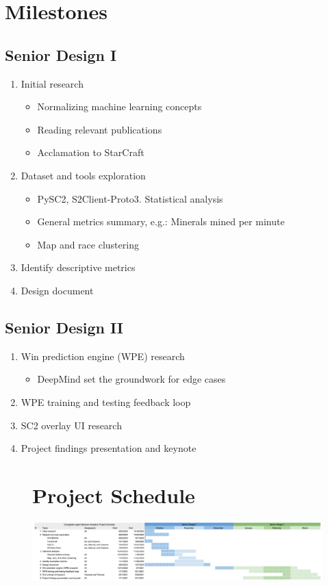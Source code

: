 \documentclass[a4paper,12pt]{report}
\begin{document}
\section{Milestones}
\subsection{Senior Design I}

\begin{enumerate}
    \item Initial research
    \begin{itemize}
        \item Normalizing machine learning concepts
        \item Reading relevant publications
        \item Acclamation to StarCraft
    \end{itemize}
    \item Dataset and tools exploration
    \begin{itemize}
        \item PySC2, S2Client-Proto3. Statistical analysis
        \item General metrics summary, e.g.: Minerals mined per minute
        \item Map and race clustering
    \end{itemize}
    \item Identify descriptive metrics
    \item Design document
\end{enumerate}

\subsection{Senior Design II}

\begin{enumerate}
    \item Win prediction engine (WPE) research
    \begin{itemize}
        \item DeepMind set the groundwork for edge cases
    \end{itemize}
    \item WPE training and testing feedback loop
    \item SC2 overlay UI research
    \item Project findings presentation and keynote
\end{enumerate}

\begin{figure}
    \section{Project Schedule}

    \centering
    \includegraphics[width=1\linewidth]{media/gantt.png}
\end{figure}
\end{document}
